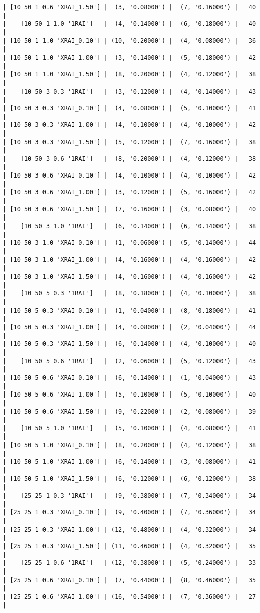 \documentclass{article}
\begin{document}
\begin{verbatim}
| [10 50 1 0.6 'XRAI_1.50'] |  (3, '0.08000') |  (7, '0.16000') |   40  |
|    [10 50 1 1.0 '1RAI']   |  (4, '0.14000') |  (6, '0.18000') |   40  |
| [10 50 1 1.0 'XRAI_0.10'] | (10, '0.20000') |  (4, '0.08000') |   36  |
| [10 50 1 1.0 'XRAI_1.00'] |  (3, '0.14000') |  (5, '0.18000') |   42  |
| [10 50 1 1.0 'XRAI_1.50'] |  (8, '0.20000') |  (4, '0.12000') |   38  |
|    [10 50 3 0.3 '1RAI']   |  (3, '0.12000') |  (4, '0.14000') |   43  |
| [10 50 3 0.3 'XRAI_0.10'] |  (4, '0.08000') |  (5, '0.10000') |   41  |
| [10 50 3 0.3 'XRAI_1.00'] |  (4, '0.10000') |  (4, '0.10000') |   42  |
| [10 50 3 0.3 'XRAI_1.50'] |  (5, '0.12000') |  (7, '0.16000') |   38  |
|    [10 50 3 0.6 '1RAI']   |  (8, '0.20000') |  (4, '0.12000') |   38  |
| [10 50 3 0.6 'XRAI_0.10'] |  (4, '0.10000') |  (4, '0.10000') |   42  |
| [10 50 3 0.6 'XRAI_1.00'] |  (3, '0.12000') |  (5, '0.16000') |   42  |
| [10 50 3 0.6 'XRAI_1.50'] |  (7, '0.16000') |  (3, '0.08000') |   40  |
|    [10 50 3 1.0 '1RAI']   |  (6, '0.14000') |  (6, '0.14000') |   38  |
| [10 50 3 1.0 'XRAI_0.10'] |  (1, '0.06000') |  (5, '0.14000') |   44  |
| [10 50 3 1.0 'XRAI_1.00'] |  (4, '0.16000') |  (4, '0.16000') |   42  |
| [10 50 3 1.0 'XRAI_1.50'] |  (4, '0.16000') |  (4, '0.16000') |   42  |
|    [10 50 5 0.3 '1RAI']   |  (8, '0.18000') |  (4, '0.10000') |   38  |
| [10 50 5 0.3 'XRAI_0.10'] |  (1, '0.04000') |  (8, '0.18000') |   41  |
| [10 50 5 0.3 'XRAI_1.00'] |  (4, '0.08000') |  (2, '0.04000') |   44  |
| [10 50 5 0.3 'XRAI_1.50'] |  (6, '0.14000') |  (4, '0.10000') |   40  |
|    [10 50 5 0.6 '1RAI']   |  (2, '0.06000') |  (5, '0.12000') |   43  |
| [10 50 5 0.6 'XRAI_0.10'] |  (6, '0.14000') |  (1, '0.04000') |   43  |
| [10 50 5 0.6 'XRAI_1.00'] |  (5, '0.10000') |  (5, '0.10000') |   40  |
| [10 50 5 0.6 'XRAI_1.50'] |  (9, '0.22000') |  (2, '0.08000') |   39  |
|    [10 50 5 1.0 '1RAI']   |  (5, '0.10000') |  (4, '0.08000') |   41  |
| [10 50 5 1.0 'XRAI_0.10'] |  (8, '0.20000') |  (4, '0.12000') |   38  |
| [10 50 5 1.0 'XRAI_1.00'] |  (6, '0.14000') |  (3, '0.08000') |   41  |
| [10 50 5 1.0 'XRAI_1.50'] |  (6, '0.12000') |  (6, '0.12000') |   38  |
|    [25 25 1 0.3 '1RAI']   |  (9, '0.38000') |  (7, '0.34000') |   34  |
| [25 25 1 0.3 'XRAI_0.10'] |  (9, '0.40000') |  (7, '0.36000') |   34  |
| [25 25 1 0.3 'XRAI_1.00'] | (12, '0.48000') |  (4, '0.32000') |   34  |
| [25 25 1 0.3 'XRAI_1.50'] | (11, '0.46000') |  (4, '0.32000') |   35  |
|    [25 25 1 0.6 '1RAI']   | (12, '0.38000') |  (5, '0.24000') |   33  |
| [25 25 1 0.6 'XRAI_0.10'] |  (7, '0.44000') |  (8, '0.46000') |   35  |
| [25 25 1 0.6 'XRAI_1.00'] | (16, '0.54000') |  (7, '0.36000') |   27  |

\end{verbatim}
\end{document}
